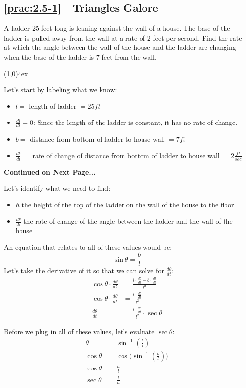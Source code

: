 \documentclass{MathNotes}
\newcommand{\br}{
	\begin{center}
		\line(1,0){4ex}
	\end{center}}
\newcommand{\continued}{
	\mbox{}
	\vfill
	\textbf{Continued on Next Page...}\newpage
}
\begin{document}
\subsection*{\ref{prac:2.5-1}---Triangles Galore}\label{ans:2.5-1}
A ladder 25 feet long is leaning against the wall of a house. The base
of the ladder is pulled away from the wall at a rate of 2 feet per
second. Find the rate at which the angle between the wall of the house and the
ladder are changing when the base of the ladder is 7 feet from the wall.
\br
Let's start by labeling what we know:
\begin{multicols}{2}
	\begin{itemize}
		\item $l=$ length of ladder $=25ft$
		\item $\frac{dl}{dt}=0$: Since the length of the ladder is
		      constant, it has no rate of change.
		\item $b=$ distance from bottom of ladder to house wall $=7ft$
		\item $\frac{db}{dt}=$ rate of change of distance from bottom of ladder
		      to house wall $=2\frac{ft}{sec}$
	\end{itemize}
\end{multicols}
\continued
Let's identify what we need to find:
\begin{itemize}
	\item $h$ the height of the top of the ladder on the wall of the house
	      to the floor
	\item $\frac{d\theta}{dt}$ the rate of change of the angle between the
	      ladder and the wall of the house
\end{itemize}

An equation that relates to all of these values would be:
$$\sin\theta=\frac{b}{l}$$
Let's take the derivative of it so that we can solve for $\frac{d\theta}{dt}$:
\begin{align*}
	\cos\theta\cdot\frac{d\theta}{dt} & =\frac{l\cdot\frac{db}{dt}-b\cdot\frac{dl}{dt}}{l^2} \\
	\cos\theta\cdot\frac{d\theta}{dt} & =\frac{l\cdot\frac{db}{dt}}{l^2}                     \\
	\frac{d\theta}{dt}                & =\frac{l\cdot\frac{db}{dt}}{l^2}\cdot\sec\theta
\end{align*}

Before we plug in all of these values, let's evaluate $\sec\theta$:
\begin{align*}
	\theta     & =\sin^{-1}(\frac{b}{l})               \\
	\cos\theta & =\cos\big(\sin^{-1}(\frac{b}{l})\big) \\
	\cos\theta & =\frac{h}{l}                          \\
	\sec\theta & =\frac{l}{h}                          \\
\end{align*}
\end{document}
